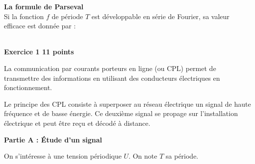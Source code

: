 \documentclass[11pt,a4paper]{article}
\begin{document}
\begin{center}
{\begin{minipage}{16.5cm}
{\vspace{8mm}
\textbf{La formule de Parseval}\\
Si la fonction $f$ de période $T$ est développable en série de Fourier, sa valeur efficace est donnée par :
\begin{center}
\end{center}

\vspace{3mm}
}
\end{minipage}}
\end{center}

\newpage


\\[2mm]
\textbf{Exercice 1 \hfill 11 points}

\medskip

La communication par courants porteurs en ligne (ou CPL) permet de transmettre des informations en utilisant des conducteurs électriques en fonctionnement.

Le principe des CPL consiste à superposer au réseau électrique un signal de haute fréquence et de basse énergie. Ce deuxième signal se propage sur l'installation électrique et peut être reçu et décodé à distance.

\textbf{Partie A : Étude d'un signal}

\medskip

On s'intéresse à une tension périodique $U$. On note $T$ sa période.

\medskip
\end{document}

